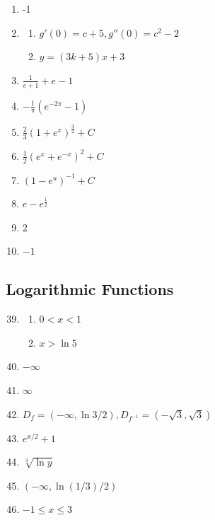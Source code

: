 \documentclass{article} \usepackage[margin=1in]{geometry}
\begin{document}
\begin{enumerate}
\begin{enumerate}
	      \end{enumerate}
	      \setcounter{enumi}{66}
	\item -1
	      \setcounter{enumi}{75}
	\item \begin{enumerate}
		      \item $g'(0)=c+5,g''(0)=c^2-2$
		      \item $y=(3k+5)x+3$
	      \end{enumerate}
	      \setcounter{enumi}{82}
	\item $\frac{1}{e+1}+e-1$
	      \setcounter{enumi}{84}
	\item $-\frac{1}{\pi}(e^{-2\pi}-1)$
	      \setcounter{enumi}{86}
	\item $\frac{2}{3}(1+e^x)^\frac{3}{2}+C$
	      \setcounter{enumi}{88}
	\item $\frac{1}{2}(e^x+e^{-x})^2+C$
	      \setcounter{enumi}{90}
	\item $(1-e^u)^{-1}+C$
	      \setcounter{enumi}{92}
	\item $e-e^\frac{1}{2}$
	      \setcounter{enumi}{104}
	\item 2
	\item $-1$
\end{enumerate}

\subsection{Logarithmic Functions}
\begin{enumerate}
	\setcounter{enumi}{38}
	\item \begin{enumerate}
		      \item $0<x<1$
		      \item $x>\ln{5}$
	      \end{enumerate}
	      \setcounter{enumi}{46}
	\item $-\infty$
	      \setcounter{enumi}{50}
	\item $\infty$
	      \setcounter{enumi}{54}
	\item $D_f=(-\infty,\ln{3}/2),D_{f^{-1}}=(-\sqrt{3},\sqrt{3})$
	      \setcounter{enumi}{58}
	\item $e^{x/2}+1$
	      \setcounter{enumi}{60}
	\item $\sqrt[3]{\ln{y}}$
	      \setcounter{enumi}{64}
	\item $(-\infty,\ln(1/3)/2)$
	      \setcounter{enumi}{72}
	\item $-1\le x\le3$
\end{enumerate}
\end{document}
